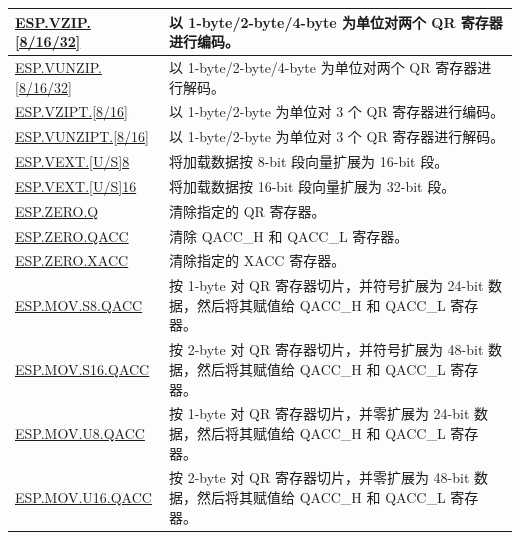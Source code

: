 \begin{longtable}[c]{|l|m{11cm}|}
    \hyperref[instruction:ESPVZIP8]{ESP.VZIP.[8/16/32]} & 以 1-byte/2-byte/4-byte 为单位对两个 QR 寄存器进行编码。\\\hline
    \hyperref[instruction:ESPVUNZIP8]{ESP.VUNZIP.[8/16/32]} & 以 1-byte/2-byte/4-byte 为单位对两个 QR 寄存器进行解码。\\\hline
    \hyperref[instruction:ESPVZIPT8]{ESP.VZIPT.[8/16]} & 以 1-byte/2-byte 为单位对 3 个 QR 寄存器进行编码。\\\hline
    \hyperref[instruction:ESPVUNZIPT8]{ESP.VUNZIPT.[8/16]} & 以 1-byte/2-byte 为单位对 3 个 QR 寄存器进行解码。\\\hline

    \hyperref[instruction:ESPVEXTS8]{ESP.VEXT.[U/S]8} & 将加载数据按 8-bit 段向量扩展为 16-bit 段。\\\hline
    \hyperref[instruction:ESPVEXTS16]{ESP.VEXT.[U/S]16} & 将加载数据按 16-bit 段向量扩展为 32-bit 段。\\\hline

    \hyperref[instruction:ESPZEROQ]{ESP.ZERO.Q} & 清除指定的 QR 寄存器。\\\hline
    \hyperref[instruction:ESPZEROQACC]{ESP.ZERO.QACC} & 清除 QACC\_H 和 QACC\_L 寄存器。\\\hline
    \hyperref[instruction:ESPZEROXACC]{ESP.ZERO.XACC} & 清除指定的 XACC 寄存器。\\\hline

    \hyperref[instruction:ESPMOVS8QACC]{ESP.MOV.S8.QACC} & 按 1-byte 对 QR 寄存器切片，并符号扩展为 24-bit 数据，然后将其赋值给 QACC\_H 和 QACC\_L 寄存器。\\\hline
    \hyperref[instruction:ESPMOVS16QACC]{ESP.MOV.S16.QACC} & 按 2-byte 对 QR 寄存器切片，并符号扩展为 48-bit 数据，然后将其赋值给 QACC\_H 和 QACC\_L 寄存器。\\\hline
    \hyperref[instruction:ESPMOVU8QACC]{ESP.MOV.U8.QACC} & 按 1-byte 对 QR 寄存器切片，并零扩展为 24-bit 数据，然后将其赋值给 QACC\_H 和 QACC\_L 寄存器。\\\hline
    \hyperref[instruction:ESPMOVU16QACC]{ESP.MOV.U16.QACC} & 按 2-byte 对 QR 寄存器切片，并零扩展为 48-bit 数据，然后将其赋值给 QACC\_H 和 QACC\_L 寄存器。\\\hline

\end{longtable}
